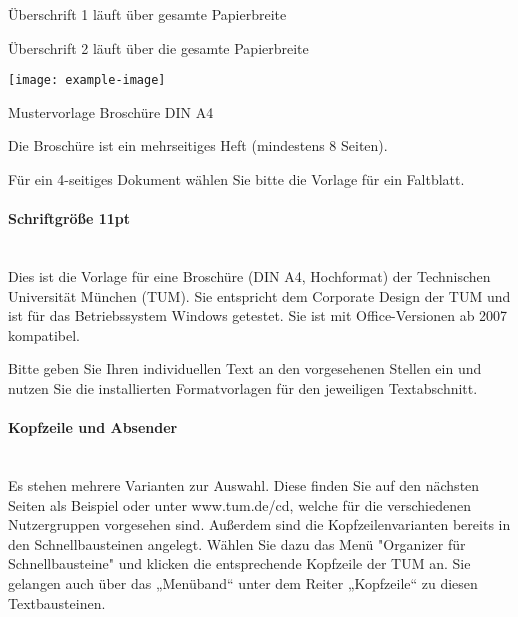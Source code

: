 \documentclass[parskip=on, twoside]{scrartcl}
\begin{document}
\pagestyle{TUM.titlepage}
{Überschrift 1 läuft über gesamte Papierbreite\par}
{ Überschrift 2 läuft über die gesamte Papierbreite\par}
\strut\par
\texttt{[image: example-image]}

\pagestyle{TUM.insidepage}
{ Mustervorlage Broschüre DIN A4\par}
\strut\par
\begin{multicols*}{2}
  { Die Broschüre ist ein mehrseitiges Heft (mindestens
    8 Seiten).\par}
  { Für ein 4-seitiges Dokument wählen Sie bitte
    die Vorlage für ein Faltblatt.\par}

  \paragraph{Schriftgröße 11pt}\strut\\
  Dies ist die Vorlage für eine Broschüre (DIN A4, Hochformat) der Technischen
  Universität München (TUM). Sie entspricht dem Corporate Design der TUM und
  ist für das Betriebssystem Windows getestet. Sie ist mit Office-Versionen ab
  2007 kompatibel.\par
  Bitte geben Sie Ihren individuellen Text an den vorgesehenen Stellen ein und
  nutzen Sie die installierten Formatvorlagen für den jeweiligen
  Textabschnitt.

  \paragraph{Kopfzeile und Absender}\strut\\
  Es stehen mehrere Varianten zur Auswahl. Diese finden Sie auf den nächsten
  Seiten als Beispiel oder unter www.tum.de/cd, welche für die verschiedenen
  Nutzergruppen vorgesehen sind. Außerdem sind die Kopfzeilenvarianten bereits
  in den Schnellbausteinen angelegt. Wählen Sie dazu das Menü "Organizer für
  Schnellbausteine" und klicken die entsprechende Kopfzeile der TUM an. Sie
  gelangen auch über das „Menüband“ unter dem Reiter „Kopfzeile“ zu diesen
  Textbausteinen.


\end{multicols*}
\end{document}
